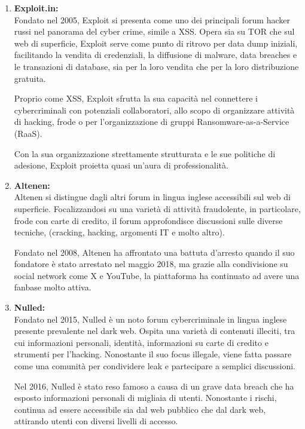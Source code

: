 \begin{enumerate}
    Inoltre, il forum presenta una sezione privata dedicata a contenuti esclusivi ed è vietato condividere informazioni riguardo la Russia.

    \item \textbf{Exploit.in:}
    \\Fondato nel 2005, Exploit si presenta come uno dei principali forum hacker russi nel panorama del cyber crime, simile a XSS. Opera sia su TOR che sul web di superficie, Exploit serve come punto di ritrovo per data dump iniziali, facilitando la vendita di credenziali, la diffusione di malware, data breaches e le transazioni di database, sia per la loro vendita che per la loro distribuzione gratuita.

    Proprio come XSS, Exploit sfrutta la sua capacità nel connettere i cybercriminali con potenziali collaboratori, allo scopo di organizzare attività di hacking, frode o per l'organizzazione di gruppi Ransomware-as-a-Service (RaaS).

    Con la sua organizzazione strettamente strutturata e le sue politiche di adesione, Exploit proietta quasi un'aura di professionalità.

    \item \textbf{Altenen:}
    \\Altenen si distingue dagli altri forum in lingua inglese accessibili sul web di superficie. Focalizzandosi su una varietà di attività fraudolente, in particolare, frode con carte di credito, il forum approfondisce discussioni sulle diverse tecniche, (cracking, hacking, argomenti IT e molto altro).

    Fondato nel 2008, Altenen ha affrontato una battuta d'arresto quando il suo fondatore è stato arrestato nel maggio 2018, ma grazie alla condivisione su social network come X e YouTube, la piattaforma ha continuato ad avere una fanbase molto attiva.

    \item \textbf{Nulled:}
    \\Fondato nel 2015, Nulled è un noto forum cybercriminale in lingua inglese presente prevalente nel dark web. Ospita una varietà di contenuti illeciti, tra cui informazioni personali, identità, informazioni su carte di credito e strumenti per l'hacking. Nonostante il suo focus illegale, viene fatta passare come una comunità per condividere leak e partecipare a semplici discussioni.

    Nel 2016, Nulled è stato reso famoso a causa di un grave data breach che ha esposto informazioni personali di migliaia di utenti. Nonostante i rischi, continua ad essere accessibile sia dal web pubblico che dal dark web, attirando utenti con diversi livelli di accesso.


\end{enumerate}
